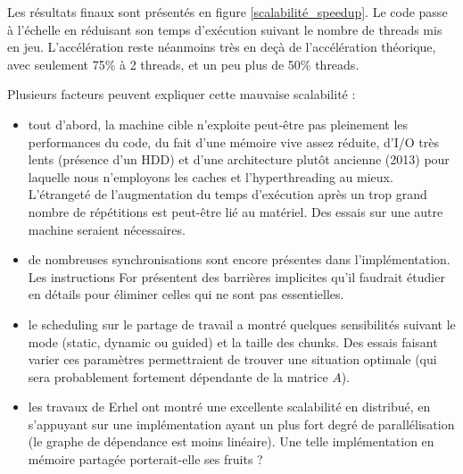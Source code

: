 \documentclass[11pt,a4paper,oneside]{memoir}
\theoremstyle{definition}
\theoremstyle{remark}
\theoremstyle{plain}
\begin{document}
Les résultats finaux sont présentés en figure \ref{scalabilité_speedup}. Le code passe à l'échelle en réduisant son temps d'exécution suivant le nombre de threads mis en jeu. L'accélération reste néanmoins très en deçà de l'accélération théorique, avec seulement 75\% à 2 threads, et un peu plus de 50\% threads.\medskip

Plusieurs facteurs peuvent expliquer cette mauvaise scalabilité :
\begin{itemize}
\item tout d'abord, la machine cible n'exploite peut-être pas pleinement les performances du code, du fait d'une mémoire vive assez réduite, d'I/O très lents (présence d'un HDD) et d'une architecture plutôt ancienne (2013) pour laquelle nous n'employons les caches et l'hyperthreading au mieux. L'étrangeté de l'augmentation du temps d'exécution après un trop grand nombre de répétitions est peut-être lié au matériel. Des essais sur une autre machine seraient nécessaires.
\item de nombreuses synchronisations sont encore présentes dans l'implémentation. Les instructions For présentent des barrières implicites qu'il faudrait étudier en détails pour éliminer celles qui ne sont pas essentielles.
\item le scheduling sur le partage de travail a montré quelques sensibilités suivant le mode (static, dynamic ou guided) et la taille des chunks. Des essais faisant varier ces paramètres permettraient de trouver une situation optimale (qui sera probablement fortement dépendante de la matrice $A$).
\item les travaux de Erhel \cite{erhel95} ont montré une excellente scalabilité en distribué, en s'appuyant sur une implémentation ayant un plus fort degré de parallélisation (le graphe de dépendance est moins linéaire). Une telle implémentation en mémoire partagée porterait-elle ses fruits ?
\end{itemize}


\end{document}
